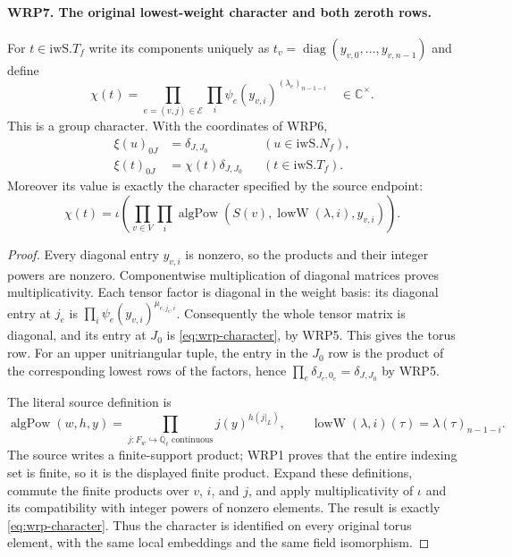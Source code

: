 \documentclass[11pt,a4paper]{article}
\numberwithin{equation}{section}
\theoremstyle{remark}\newtheorem{remark}[theorem]{Remark}
\begin{document}
\paragraph{WRP7. The original lowest-weight character and both zeroth rows.}
\label{claim:WRP7}
For $t\in\mathrm{iwS}.T_f$ write its components uniquely as
$t_v=\operatorname{diag}(y_{v,0},\ldots,\allowbreak{} y_{v,\allowbreak{} n-1})$ and define
\begin{equation}\label{eq:wrp-character}
 \chi(t)=\prod_{e=(v,\allowbreak{} j)\in\mathcal E}\prod_i
                  \psi_e(y_{v,\allowbreak{} i})^{(\lambda_e)_{n-1-i}}
                  \quad\in\mathbb C^\times.
\end{equation}
This is a group character.  With the coordinates of WRP6,
\begin{align}
 \xi(u)_{0J}&=\delta_{J,\allowbreak{} J_0} &&(u\in\mathrm{iwS}.N_f),\\
 \xi(t)_{0J}&=\chi(t)\delta_{J,\allowbreak{} J_0}
                                      &&(t\in\mathrm{iwS}.T_f).
 \label{eq:wrp-rows}
\end{align}
Moreover its value is exactly the character specified by
the source endpoint:
\begin{equation}\label{eq:wrp-lowW}
 \chi(t)=\iota\left(\prod_{v\in V}\prod_i
     \operatorname{algPow}(S(v),\operatorname{lowW}(\lambda,\allowbreak{} i),
                                                       y_{v,\allowbreak{} i})\right).
\end{equation}
\begin{proof}
Every diagonal entry $y_{v,\allowbreak{} i}$ is nonzero, so the products
and their integer powers are nonzero.  Componentwise
multiplication of diagonal matrices proves multiplicativity.
Each tensor factor is diagonal in the weight basis: its
diagonal entry at $j_e$ is
$\prod_i\psi_e(y_{v,\allowbreak{} i})^{\mu_{e,\allowbreak{} j_e,\allowbreak{} i}}$.  Consequently
the whole tensor matrix is diagonal, and its entry at
$J_0$ is \eqref{eq:wrp-character}, by WRP5.  This gives
the torus row.  For an upper unitriangular tuple, the entry
in the $J_0$ row is the product of the corresponding lowest
rows of the factors, hence
$\prod_e\delta_{J_e,0_e}=\delta_{J,\allowbreak{} J_0}$ by WRP5.

The literal source definition is
\[
 \operatorname{algPow}(w,\allowbreak{} h,\allowbreak{} y)=
       \prod_{j:F_w\hookrightarrow\overline{\mathbb Q}_\ell
                         \text{ continuous}} j(y)^{h(j|_L)},
 \qquad
 \operatorname{lowW}(\lambda,\allowbreak{} i)(\tau)=\lambda(\tau)_{n-1-i}.
\]
The source writes a finite-support product; WRP1 proves that
the entire indexing set is finite, so it is the displayed
finite product.  Expand these definitions, commute the finite
products over $v$, $i$, and $j$, and apply multiplicativity
of $\iota$ and its compatibility with integer powers of
nonzero elements.  The result is exactly
\eqref{eq:wrp-character}.  Thus the character is identified
on every original torus element, with the same local
embeddings and the same field isomorphism.
\end{proof}
\end{document}
